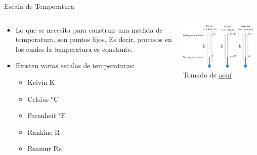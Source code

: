 \documentclass[aspectratio=169]{beamer}
\begin{document}
\begin{frame}{Escala de Temperatura}
    \begin{columns}[c, onlytextwidth]
        \begin{column}{0.50\textwidth}
            \begin{itemize}
                \item Lo que se necesita para construir una medida de temperatura, son puntos fijos. Es decir, procesos en los cuales la temperatura es constante.
                \item Existen varias escalas de temperaturas:
                \begin{itemize}
                    \item Kelvin $\si{\kelvin}$
                    \item Celsius $\si{\celsius}$
                    \item Farenheit $\si{\degree}\mathrm{F}$
                    \item Rankine $\mathrm{R}$
                    \item Reamur $\mathrm{Re}$
                \end{itemize}
            \end{itemize}
        \end{column}
        \begin{column}{0.5\textwidth}
            \includegraphics[width=7cm]{fig/temperature_scales.png}
            \newline
            \tiny{Tomado de \href{https://glossary.periodni.com/dictionary.php?en=logaritamska+skala}{aquí}}
        \end{column}
    \end{columns}
\end{frame}
\end{document}
